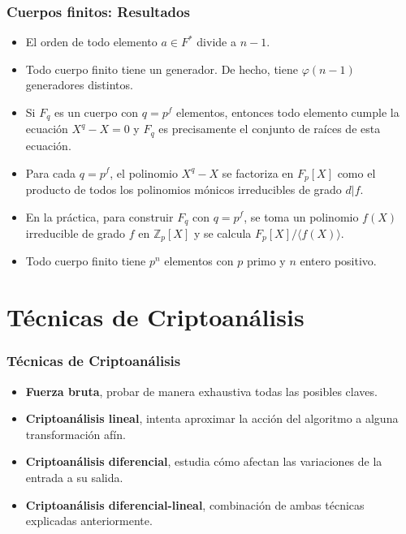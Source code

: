 \documentclass{beamer}
\begin{document}
	\begin{frame}
	\frametitle{Cuerpos finitos: Resultados}
	\begin{itemize}
		\item El orden de todo elemento $a \in F^*$ divide a $n-1$.
		
		\item Todo cuerpo finito tiene un generador. De hecho, tiene $\varphi (n-1)$ generadores distintos.
		
		\item Si $F_q$ es un cuerpo con $q = p^f$ elementos, entonces todo elemento cumple la ecuación $X^q - X = 0$ y $F_q$ es precisamente el conjunto de raíces de esta ecuación.
		
		\item Para cada $q = p^f$, el polinomio $X^q - X$ se factoriza en $F_p[X]$ como el producto de todos los polinomios mónicos irreducibles de grado $d|f$.
		
		\item En la práctica, para construir $F_q$ con $q = p^f$, se toma un polinomio $f(X)$ irreducible de grado $f$ en $\mathbb{Z}_p[X]$ y se calcula $F_p[X] / \langle f(X) \rangle$.
		
		\item Todo cuerpo finito tiene $p^n$ elementos con $p$ primo y $n$ entero positivo.
	\end{itemize}
	\end{frame}


\section{Técnicas de Criptoanálisis}
	\begin{frame}
		\frametitle{Técnicas de Criptoanálisis}
		\begin{itemize}
			\item \textbf{Fuerza bruta}, probar de manera exhaustiva todas las posibles claves.
			
			\item \textbf{Criptoanálisis lineal}, intenta aproximar la acción del algoritmo a alguna transformación afín.
			
			\item \textbf{Criptoanálisis diferencial}, estudia cómo afectan las variaciones de la entrada a su salida.
			
			\item \textbf{Criptoanálisis diferencial-lineal}, combinación de ambas técnicas explicadas anteriormente.
		\end{itemize}
	\end{frame}
	
\end{document}
